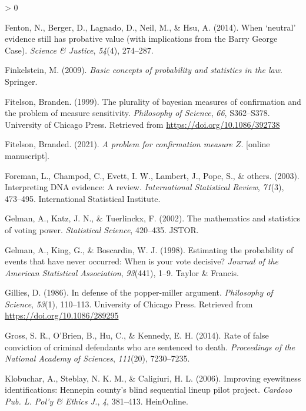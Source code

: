 \documentclass[
  10pt,
  dvipsnames,enabledeprecatedfontcommands]{scrartcl}
\newlength{\cslhangindent}
\newenvironment{CSLReferences}[2] %
 {%
  \setlength{\parindent}{0pt}
  \ifodd #1 \everypar{\setlength{\hangindent}{\cslhangindent}}\ignorespaces\fi
  \ifnum #2 > 0
  \setlength{\parskip}{#2\baselineskip}
  \fi
 }%
 {}
\begin{document}
\begin{CSLReferences}{1}{0}
\leavevmode\hypertarget{ref-fenton2014WhenNeutralEvidence}{}%
Fenton, N., Berger, D., Lagnado, D., Neil, M., \& Hsu, A. (2014). When
{`neutral'} evidence still has probative value (with implications from
the {Barry George Case}). \emph{Science \& Justice}, \emph{54}(4),
274--287.

\leavevmode\hypertarget{ref-finkelstein2009basic}{}%
Finkelstein, M. (2009). \emph{Basic concepts of probability and
statistics in the law}. Springer.

\leavevmode\hypertarget{ref-Fitelson1999plurality}{}%
Fitelson, Branden. (1999). The plurality of bayesian measures of
confirmation and the problem of measure sensitivity. \emph{Philosophy of
Science}, \emph{66}, S362--S378. University of Chicago Press. Retrieved
from \url{https://doi.org/10.1086/392738}

\leavevmode\hypertarget{ref-Fitelson2021z_measure}{}%
Fitelson, Branded. (2021). \emph{A problem for confirmation measure
\(Z\)}. {[}online manuscript{]}.

\leavevmode\hypertarget{ref-foreman2003interpreting}{}%
Foreman, L., Champod, C., Evett, I. W., Lambert, J., Pope, S., \&
others. (2003). Interpreting DNA evidence: A review. \emph{International
Statistical Review}, \emph{71}(3), 473--495. International Statistical
Institute.

\leavevmode\hypertarget{ref-gelman2002mathematics}{}%
Gelman, A., Katz, J. N., \& Tuerlinckx, F. (2002). The mathematics and
statistics of voting power. \emph{Statistical Science}, 420--435. JSTOR.

\leavevmode\hypertarget{ref-gelman1998estimating}{}%
Gelman, A., King, G., \& Boscardin, W. J. (1998). Estimating the
probability of events that have never occurred: When is your vote
decisive? \emph{Journal of the American Statistical Association},
\emph{93}(441), 1--9. Taylor \& Francis.

\leavevmode\hypertarget{ref-Gillies1986defense}{}%
Gillies, D. (1986). In defense of the popper-miller argument.
\emph{Philosophy of Science}, \emph{53}(1), 110--113. University of
Chicago Press. Retrieved from \url{https://doi.org/10.1086/289295}

\leavevmode\hypertarget{ref-gross2014RateFalseConviction}{}%
Gross, S. R., O'Brien, B., Hu, C., \& Kennedy, E. H. (2014). Rate of
false conviction of criminal defendants who are sentenced to death.
\emph{Proceedings of the National Academy of Sciences}, \emph{111}(20),
7230--7235.

\leavevmode\hypertarget{ref-klobuchar2006improving}{}%
Klobuchar, A., Steblay, N. K. M., \& Caligiuri, H. L. (2006). Improving
eyewitness identifications: Hennepin county's blind sequential lineup
pilot project. \emph{Cardozo Pub. L. Pol'y \& Ethics J.}, \emph{4},
381--413. HeinOnline.


\end{CSLReferences}
\end{document}
